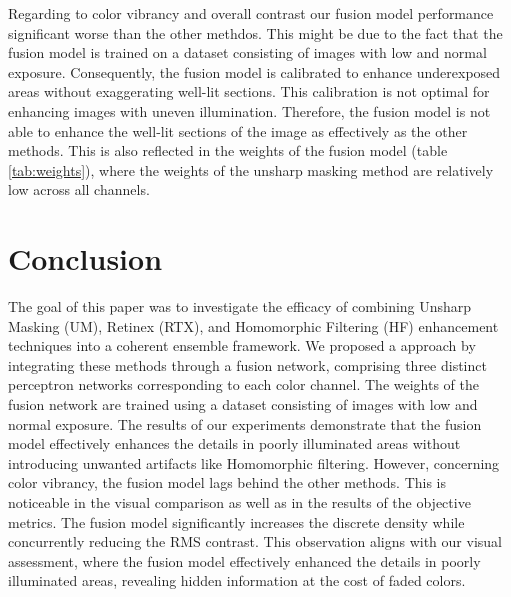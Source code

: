 \documentclass[sigconf]{acmart}
\begin{document}
Regarding to color vibrancy and overall contrast our fusion model performance significant worse than the other methdos. This might be due to the fact that the fusion model is trained on a dataset consisting of images with low and normal exposure. Consequently, the fusion model is calibrated to enhance underexposed areas without exaggerating well-lit sections. This calibration is not optimal for enhancing images with uneven illumination. Therefore, the fusion model is not able to enhance the well-lit sections of the image as effectively as the other methods. This is also reflected in the weights of the fusion model (table \ref{tab:weights}), where the weights of the unsharp masking method are relatively low across all channels.

\section{Conclusion}\label{sec:conclusion}

The goal of this paper was to investigate the efficacy of combining Unsharp Masking (UM), Retinex (RTX), and Homomorphic Filtering (HF) enhancement techniques into a coherent ensemble framework. We proposed a approach by integrating these methods through a fusion network, comprising three distinct perceptron networks corresponding to each color channel. The weights of the fusion network are trained using a dataset consisting of images with low and normal exposure. 
The results of our experiments demonstrate that the fusion model effectively enhances the details in poorly illuminated areas without introducing unwanted artifacts like Homomorphic filtering. However, concerning color vibrancy, the fusion model lags behind the other methods. This is noticeable in the visual comparison as well as in the results of the objective metrics. The fusion model significantly increases the discrete density while concurrently reducing the RMS contrast. This observation aligns with our visual assessment, where the fusion model effectively enhanced the details in poorly illuminated areas, revealing hidden information at the cost of faded colors.










\end{document}
